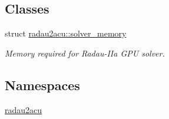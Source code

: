 \subsection*{Classes}
\begin{DoxyCompactItemize}
\item 
struct \hyperlink{structradau2acu_1_1solver__memory}{radau2acu\+::solver\+\_\+memory}
\begin{DoxyCompactList}\small\item\em Memory required for Radau-\/\+I\+Ia G\+PU solver. \end{DoxyCompactList}\end{DoxyCompactItemize}
\subsection*{Namespaces}
\begin{DoxyCompactItemize}
\item 
 \hyperlink{namespaceradau2acu}{radau2acu}
\end{DoxyCompactItemize}
